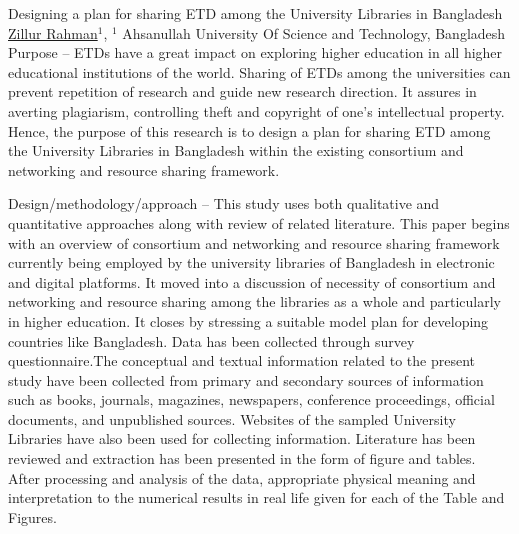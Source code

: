
    \begin{abstract_online}{Designing a plan for sharing ETD among the University Libraries in Bangladesh}{%
        \underline{Zillur Rahman}$^{1}$,{%
        }{%
        $^1$ Ahsanullah University Of Science and Technology, Bangladesh}
            }
  	 Purpose – ETDs have a great impact on exploring higher education in all higher educational institutions of the world. Sharing of ETDs among the universities can prevent repetition of research and guide new research direction.  It assures in averting plagiarism, controlling theft and copyright of one’s intellectual property. Hence, the purpose of this research is to design a plan for sharing ETD among the University Libraries in Bangladesh within the existing consortium and networking and resource sharing framework.
         
         Design/methodology/approach – This study uses both qualitative and quantitative approaches along with review of related literature. This paper begins with an overview of consortium and networking and resource sharing framework currently being employed by the university libraries of Bangladesh in electronic and digital platforms. It moved into a discussion of necessity of consortium and networking and resource sharing among the libraries as a whole and particularly in higher education. It closes by stressing a suitable model plan for developing countries like Bangladesh. Data has been collected through survey questionnaire.The conceptual and textual information related to the present study have been collected from primary and secondary sources of information such as books, journals, magazines, newspapers, conference proceedings, official documents, and unpublished sources. Websites of the sampled University Libraries have also been used for collecting information. Literature has been reviewed and extraction has been presented in the form of figure and tables. After processing and analysis of the data, appropriate physical meaning and interpretation to the numerical results in real life given for each of the Table and Figures.
      

\end{abstract_online}
